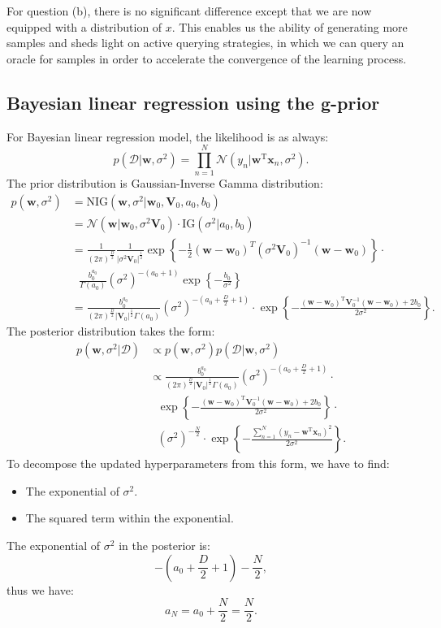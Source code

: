 \documentclass[UTF8]{ctexart}
\begin{document}
For question (b), there is no significant difference except that we are now equipped with a distribution of $x$.
This enables us the ability of generating more samples and sheds light on active querying strategies, in which we can query an oracle for samples in order to accelerate the convergence of the learning process.

\subsection{Bayesian linear regression using the g-prior}
For Bayesian linear regression model, the likelihood is as always:
$$p(\mathcal{D}|\textbf{w},\sigma^{2})=\prod_{n=1}^{N}\mathcal{N}(y_{n}|\textbf{w}^{\text{T}}\textbf{x}_{n},\sigma^{2}).$$
The prior distribution is Gaussian-Inverse Gamma distribution:
$$
\begin{aligned}
p(\textbf{w},\sigma^{2})&=\text{NIG}(\textbf{w},\sigma^{2}|\textbf{w}_{0},\textbf{V}_{0},a_{0},b_{0})\\
&=\mathcal{N}(\textbf{w}|\textbf{w}_{0},\sigma^{2}\textbf{V}_{0})\cdot\text{IG}(\sigma^{2}|a_{0},b_{0}) \\
&=\frac{1}{(2\pi)^{\frac{D}{2}}}\frac{1}{|\sigma^{2}\textbf{V}_{0}|^{\frac{1}{2}}}\exp\left\{ -\frac{1}{2}(\textbf{w}-\textbf{w}_{0})^{T}(\sigma^{2}\textbf{V}_{0})^{-1}(\textbf{w}-\textbf{w}_{0}) \right\} \cdot \\
&\ \ \ \frac{b_{0}^{a_{0}}}{\Gamma(a_{0})}(\sigma^{2})^{-(a_{0}+1)}\exp\left\{ -\frac{b_{0}}{\sigma^{2}} \right\} \\
&=\frac{b_{0}^{a_{0}}}{(2\pi)^{\frac{D}{2}}|\textbf{V}_{0}|^{\frac{1}{2}}\Gamma(a_{0})}(\sigma^{2})^{-\left(a_{0}+\frac{D}{2}+1\right)}\cdot\exp\left\{ -\frac{(\textbf{w}-\textbf{w}_{0})^{\text{T}}\textbf{V}_{0}^{-1}(\textbf{w}-\textbf{w}_{0})+2b_{0}}{2\sigma^{2}} \right\}.
\end{aligned}
$$
The posterior distribution takes the form:
$$
\begin{aligned}
p(\textbf{w},\sigma^{2}|\mathcal{D}) &\propto p(\textbf{w},\sigma^{2})p(\mathcal{D}|\textbf{w},\sigma^{2})\\
&\propto \frac{b_{0}^{a_{0}}}{(2\pi)^{\frac{D}{2}}|\textbf{V}_{0}|^{\frac{1}{2}}\Gamma(a_{0})}(\sigma^{2})^{-\left(a_{0}+\frac{D}{2}+1\right)}\cdot \\
&\ \ \ \exp\left\{ -\frac{(\textbf{w}-\textbf{w}_{0})^{\text{T}}\textbf{V}_{0}^{-1}(\textbf{w}-\textbf{w}_{0})+2b_{0}}{2\sigma^{2}} \right\} \cdot \\
&\ \ \ (\sigma^{2})^{-\frac{N}{2}}\cdot \exp\left\{ -\frac{\sum_{n=1}^{N}(y_{n}-\textbf{w}^{\text{T}}\textbf{x}_{n})^{2}}{2\sigma^{2}}  \right\}.
\end{aligned}
$$
To decompose the updated hyperparameters from this form, we have to find:
\begin{itemize}
\item The exponential of $\sigma^{2}$.
\item The squared term within the exponential.
\end{itemize}
The exponential of $\sigma^{2}$ in the posterior is:
$$-\left(a_{0}+\frac{D}{2}+1\right)-\frac{N}{2},$$
thus we have:
$$a_{N}=a_{0}+\frac{N}{2}=\frac{N}{2}.$$
\end{document}

